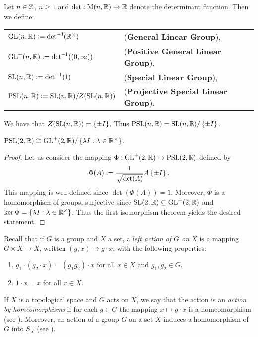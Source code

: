 \begin{definition}
	Let $n \in \mathbb{Z}$, $n \geq 1$ and $\mathrm{det} : \mathrm{M}(n,\mathbb{R}) \to \mathbb{R}$ denote the determinant function. Then we define:
	\begin{center}
		\begin{tabular}{ll}
			$\mathrm{GL}(n,\mathbb{R}) := \mathrm{det}^{-1}(\mathbb{R}^\times)$ & (\textbf{General Linear Group}),\\
			$\GLrm^+(n,\Rbb) := \det^{-1}(\intoo{0,\infty})$ & (\textbf{Positive General Linear Group}),\\
			$\mathrm{SL}(n,\mathbb{R}) := \mathrm{det}^{-1}(1)$ & (\textbf{Special Linear Group}),\\
			$\mathrm{PSL}(n,\mathbb{R}) := \mathrm{SL}(n,\mathbb{R})/ Z(\mathrm{SL}(n,\mathbb{R}))$ & (\textbf{Projective Special Linear Group}).\\
		\end{tabular}
	\end{center}
\end{definition}

\begin{remark}
	We have that $Z(\SLrm(n,\Rbb)) = \cbr[0]{\pm I}$. Thus $\PSLrm(n,\Rbb) = \SLrm(n,\Rbb)/\cbr[0]{\pm I}$.
\end{remark}

\begin{lemma}
	$\PSLrm(2,\Rbb) \cong \GLrm^+(2,\Rbb)/\cbr[0]{\lambda I : \lambda \in \Rbb^\times}$.
	\label{lem:isomorphism}
\end{lemma}

\begin{proof}
	Let us consider the mapping $\Phi : \mathrm{GL}^+(2,\mathbb{R}) \to \mathrm{PSL}(2,\mathbb{R})$ defined by
	\begin{equation*}
		\Phi(A) := \frac{1}{\sqrt{\det(A)}} A \cbr[0]{\pm I}.
	\end{equation*}
	This mapping is well-defined since $\det(\Phi(A)) = 1$. Moreover, $\Phi$ is a homomorphism of groups, surjective since $\mathrm{SL}(2,\mathbb{R}) \subseteq \mathrm{GL}^+(2,\mathbb{R})$ and $\ker \Phi = \cbr[0]{\lambda I : \lambda \in \Rbb^\times}$. Thus the first isomorphism theorem yields the desired statement.  
\end{proof}

Recall that if $G$ is a group and $X$ a set, a \emph{left action of $G$ on $X$} is a mapping $G \times X \to X$, written $(g,x) \mapsto g \cdot x$, with the following properties:
\begin{enumerate}[label = \textup{(}\roman*\textup{)}]
	\item $g_1 \cdot (g_2 \cdot x) = (g_1g_2) \cdot x$ for all $x \in X$ and $g_1,g_2 \in G$.
	\item $1 \cdot x = x$ for all $x \in X$.
\end{enumerate}
If $X$ is a topological space and $G$ acts on $X$, we say that the action is an \emph{action by homeomorphisms} if for each $g \in G$ the mapping $x \mapsto g \cdot x$ is a homeomorphism (see \cite[78--79]{lee:topological_manifolds:2011}). Moreover, an action of a group $G$ on a set $X$ induces a homomorphism of $G$ into $S_X$ (see \cite[54]{grillet:abstract_algebra:2007}).

